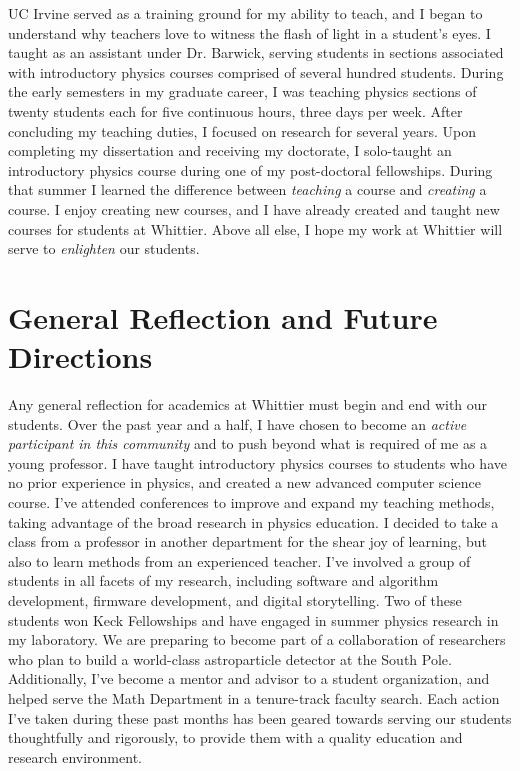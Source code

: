 \documentclass[../../main.tex]{subfiles}
\begin{document}
UC Irvine served as a training ground for my ability to teach, and I began to understand why teachers love to witness the flash of light in a student's eyes.  I taught as an assistant under Dr. Barwick, serving students in sections associated with introductory physics courses comprised of several hundred students.  During the early semesters in my graduate career, I was teaching physics sections of twenty students each for five continuous hours, three days per week.  After concluding my teaching duties, I focused on research for several years.  Upon completing my dissertation and receiving my doctorate, I solo-taught an introductory physics course during one of my post-doctoral fellowships.  During that summer I learned the difference between \textit{teaching} a course and \textit{creating} a course.  I enjoy creating new courses, and I have already created and taught new courses for students at Whittier.  Above all else, I hope my work at Whittier will serve to \textit{enlighten} our students.

\section{General Reflection and Future Directions}

Any general reflection for academics at Whittier must begin and end with our students.  Over the past year and a half, I have chosen to become an \textit{active participant in this community} and to push beyond what is required of me as a young professor.  I have taught introductory physics courses to students who have no prior experience in physics, and created a new advanced computer science course.  I've attended conferences to improve and expand my teaching methods, taking advantage of the broad research in physics education.  I decided to take a class from a professor in another department for the shear joy of learning, but also to learn methods from an experienced teacher.  I've involved a group of students in all facets of my research, including software and algorithm development, firmware development, and digital storytelling.  Two of these students won Keck Fellowships and have engaged in summer physics research in my laboratory.  We are preparing to become part of a collaboration of researchers who plan to build a world-class astroparticle detector at the South Pole.  Additionally, I've become a mentor and advisor to a student organization, and helped serve the Math Department in a tenure-track faculty search.  Each action I've taken during these past months has been geared towards serving our students thoughtfully and rigorously, to provide them with a quality education and research environment. \\ \hspace{0.1cm}
\end{document}
